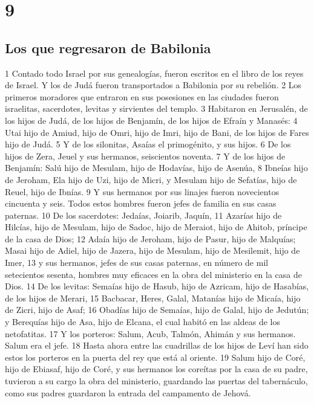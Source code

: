 \chapter{9}

\section*{Los que regresaron de Babilonia}

1 Contado todo Israel por sus genealogías, fueron escritos en el libro de los reyes de Israel. Y los de Judá fueron transportados a Babilonia por su rebelión.
2 Los primeros moradores que entraron en sus posesiones en las ciudades fueron israelitas, sacerdotes, levitas y sirvientes del templo.
3 Habitaron en Jerusalén, de los hijos de Judá, de los hijos de Benjamín, de los hijos de Efraín y Manasés:
4 Utai hijo de Amiud, hijo de Omri, hijo de Imri, hijo de Bani, de los hijos de Fares hijo de Judá.
5 Y de los silonitas, Asaías el primogénito, y sus hijos.
6 De los hijos de Zera, Jeuel y sus hermanos, seiscientos noventa.
7 Y de los hijos de Benjamín: Salú hijo de Mesulam, hijo de Hodavías, hijo de Asenúa,
8 Ibneías hijo de Jeroham, Ela hijo de Uzi, hijo de Micri, y Mesulam hijo de Sefatías, hijo de Reuel, hijo de Ibnías.
9 Y sus hermanos por sus linajes fueron novecientos cincuenta y seis. Todos estos hombres fueron jefes de familia en sus casas paternas.
10 De los sacerdotes: Jedaías, Joiarib, Jaquín,
11 Azarías hijo de Hilcías, hijo de Mesulam, hijo de Sadoc, hijo de Meraiot, hijo de Ahitob, príncipe de la casa de Dios;
12 Adaía hijo de Jeroham, hijo de Pasur, hijo de Malquías; Masai hijo de Adiel, hijo de Jazera, hijo de Mesulam, hijo de Mesilemit, hijo de Imer,
13 y sus hermanos, jefes de sus casas paternas, en número de mil setecientos sesenta, hombres muy eficaces en la obra del ministerio en la casa de Dios.
14 De los levitas: Semaías hijo de Hasub, hijo de Azricam, hijo de Hasabías, de los hijos de Merari,
15 Bacbacar, Heres, Galal, Matanías hijo de Micaía, hijo de Zicri, hijo de Asaf;
16 Obadías hijo de Semaías, hijo de Galal, hijo de Jedutún; y Berequías hijo de Asa, hijo de Elcana, el cual habitó en las aldeas de los netofatitas.
17 Y los porteros: Salum, Acub, Talmón, Ahimán y sus hermanos. Salum era el jefe.
18 Hasta ahora entre las cuadrillas de los hijos de Leví han sido estos los porteros en la puerta del rey que está al oriente.
19 Salum hijo de Coré, hijo de Ebiasaf, hijo de Coré, y sus hermanos los coreítas por la casa de su padre, tuvieron a su cargo la obra del ministerio, guardando las puertas del tabernáculo, como sus padres guardaron la entrada del campamento de Jehová.
